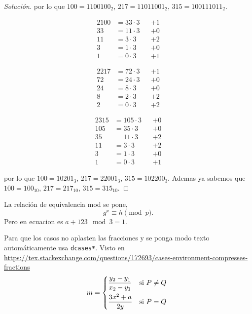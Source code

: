 \documentclass[spanish,mexico]{article}
\numberwithin{equation}{section}
\theoremstyle{definition}
\theoremstyle{remark}
\newenvironment{solution}{\begin{proof}[Solución]}{\end{proof}}
\begin{document}
\begin{enumerate}[wide]
\begin{solution}
    por lo que $100=1100100_2$, $217=11011001_2$, $315=100111011_2$.
    
    \begin{minipage}{.3\linewidth}
      \begin{alignat*}{2}
        100 &=33\cdot3&&+1\\
        33  &=11\cdot3&&+0\\
        11  &=3 \cdot3&&+2\\
        3   &=1 \cdot3&&+0\\
        1   &=0 \cdot3&&+1
      \end{alignat*}
    \end{minipage}
    \begin{minipage}{.3\linewidth}
      \begin{alignat*}{2}
        217 &=72 \cdot3&&+1\\
        72  &=24 \cdot3&&+0\\
        24  &=8  \cdot3&&+0\\
        8   &=2  \cdot3&&+2\\
        2   &=0  \cdot3&&+2
      \end{alignat*}
    \end{minipage}
    \begin{minipage}{.3\linewidth}
      \begin{alignat*}{2}
        315 &=105 \cdot3&&+0\\
        105 &=35  \cdot3&&+0\\
        35  &=11  \cdot3&&+2\\
        11  &=3   \cdot3&&+2\\
        3   &=1   \cdot3&&+0\\
        1   &=0   \cdot3&&+1
      \end{alignat*}
    \end{minipage}
    
    por lo que $100=10201_3$, $217=22001_3$, $315=102200_3$. Ademas ya sabemos que $100=100_{10}$, $217=217_{10}$, $315=315_{10}$.
\end{solution}

\end{enumerate}
La relación de equivalencia mod se pone,
\[
    g^x
    \equiv h
    \pmod{p}.
\]
Pero en ecuacion es $a+123\mod 3=1$.

Para que los casos no aplasten las fracciones y se ponga modo texto automáticamente usa \texttt{dcases*}. Visto en \url{https://tex.stackexchange.com/questions/172693/cases-environment-compresses-fractions} 
\[
    m=
    \begin{dcases*}
        \frac{y_2-y_1}{x_2-y_1} &si $P\neq Q$\\
        \frac{3x^2+a}{2y}       &si $P=Q$
    \end{dcases*}
\]
\end{document}
